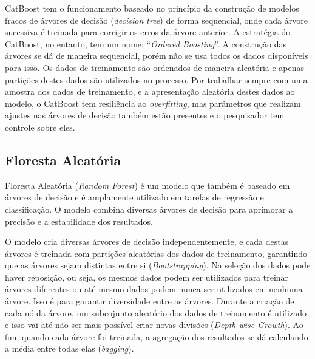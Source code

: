 CatBoost tem o funcionamento baseado no princípio da construção de modelos fracos de árvores de decisão (\textit{decision tree}) de forma sequencial, onde cada árvore sucessiva é treinada para corrigir os erros da árvore anterior. A estratégia do CatBoost, no entanto, tem um nome: ``\textit{Ordered Boosting}''. A construção das árvores se dá de maneira sequencial, porém não se usa todos os dados disponíveis para isso. Os dados de treinamento são ordenados de maneira aleatória e apenas partições destes dados são utilizados no processo. Por trabalhar sempre com uma amostra dos dados de treinamento, e a apresentação aleatória destes dados ao modelo, o CatBoost tem resiliência ao \textit{overfitting}, mas parâmetros que realizam ajustes nas árvores de decisão também estão presentes e o pesquisador tem controle sobre eles.\cite{catboost_docs}\cite{dorogush2018catboost}\cite{prokhorenkova2018catboost}


\subsection{Floresta Aleatória}

Floresta Aleatória (\textit{Random Forest}) é um modelo que também é baseado em árvores de decisão e é amplamente utilizado em tarefas de regressão e classificação. O modelo combina diversas árvores de decisão para aprimorar a precisão e a estabilidade dos resultados.

O modelo cria diversas árvores de decisão independentemente, e cada destas árvores é treinada com partições aleatórias dos dados de treinamento, garantindo que as árvores sejam distintas entre si (\textit{Bootstrapping}). Na seleção dos dados pode haver reposição, ou seja, os mesmos dados podem ser utilizados para treinar árvores diferentes ou até mesmo dados podem nunca ser utilizados em nenhuma árvore. Isso é para garantir diversidade entre as árvores. Durante a criação de cada nó da árvore, um subcojunto aleatório dos dados de treinamento é utilizado e isso vai até não ser mais possível criar novas divisões (\textit{Depth-wise Growth}). Ao fim, quando cada árvore foi treinada, a agregação dos resultados se dá calculando a média entre todas elas (\textit{bagging}).\cite{hasan_ahmed_salman_2024}\cite{sklearn_random_forest_2024}

